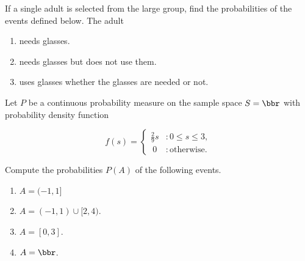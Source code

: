 \documentclass[12pt,reqno]{amsart}
\begin{document}
If a single adult is selected from the large group, find the probabilities of the events defined below. The adult

\medskip
\begin{enumerate}
    \item needs glasses.\vfill
    
    

    \item needs glasses but does not use them.\vfill
    
    

    \item uses glasses whether the glasses are needed or not.\vfill
    
    
\end{enumerate}















\prob Let $P$ be a continuous probability measure on the sample space $S=\bbr$ with probability density function

    \[f(s) = \begin{cases}
    \frac{2}{9}s & : 0 \leq s \leq 3, \\\
    0 & : \text{otherwise}.    
    \end{cases}\]

Compute the probabilities $P(A)$ of the following events.

\medskip
\begin{enumerate}
    \item $A=(-1, 1]$\vfill
    


    \item $A = (-1,1) \cup [2, 4)$.\vfill
    


    \item $A = [0,3]$.\vfill
    


    \item $A = \bbr$.\vfill
    

\end{enumerate}
\end{document}
